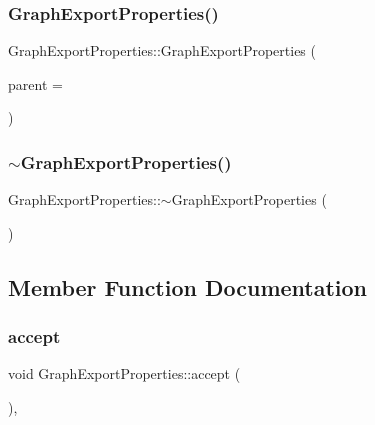 \subsubsection{\texorpdfstring{GraphExportProperties()}{GraphExportProperties()}}
{\footnotesize\ttfamily Graph\+Export\+Properties\+::\+Graph\+Export\+Properties (\begin{DoxyParamCaption}\item[{Q\+Widget $\ast$}]{parent = {} }\end{DoxyParamCaption})\hspace{0.3cm}{\ttfamily [explicit]}}

\mbox{\label{class_graph_export_properties_a552acb3720297773c3f9dd5ca6295a76}} 
\subsubsection{\texorpdfstring{$\sim$GraphExportProperties()}{~GraphExportProperties()}}
{\footnotesize\ttfamily Graph\+Export\+Properties\+::$\sim$\+Graph\+Export\+Properties (\begin{DoxyParamCaption}{ }\end{DoxyParamCaption})}



\subsection{Member Function Documentation}
\mbox{\label{class_graph_export_properties_a00f998b75d197b0951f3196c4e077783}} 
\subsubsection{\texorpdfstring{accept}{accept}}
{\footnotesize\ttfamily void Graph\+Export\+Properties\+::accept (\begin{DoxyParamCaption}{ }\end{DoxyParamCaption})\hspace{0.3cm}{\ttfamily [override]}, {\ttfamily [slot]}}

